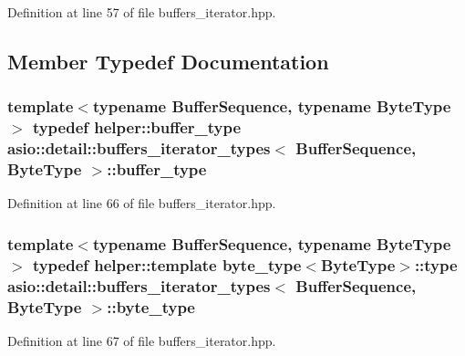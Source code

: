 Definition at line 57 of file buffers\+\_\+iterator.\+hpp.



\subsection{Member Typedef Documentation}
\hypertarget{structasio_1_1detail_1_1buffers__iterator__types_a7aa8572359d0a382a741a69ca1d46e22}{}
\subsubsection[{buffer\+\_\+type}]{\setlength{\rightskip}{0pt plus 5cm}template$<$typename Buffer\+Sequence, typename Byte\+Type$>$ typedef helper\+::buffer\+\_\+type {\bf asio\+::detail\+::buffers\+\_\+iterator\+\_\+types}$<$ Buffer\+Sequence, Byte\+Type $>$\+::{\bf buffer\+\_\+type}}\label{structasio_1_1detail_1_1buffers__iterator__types_a7aa8572359d0a382a741a69ca1d46e22}


Definition at line 66 of file buffers\+\_\+iterator.\+hpp.

\hypertarget{structasio_1_1detail_1_1buffers__iterator__types_a1e923f24ebb373133ae1c54a816fce3e}{}
\subsubsection[{byte\+\_\+type}]{\setlength{\rightskip}{0pt plus 5cm}template$<$typename Buffer\+Sequence, typename Byte\+Type$>$ typedef helper\+::template {\bf byte\+\_\+type}$<$Byte\+Type$>$\+::type {\bf asio\+::detail\+::buffers\+\_\+iterator\+\_\+types}$<$ Buffer\+Sequence, Byte\+Type $>$\+::{\bf byte\+\_\+type}}\label{structasio_1_1detail_1_1buffers__iterator__types_a1e923f24ebb373133ae1c54a816fce3e}


Definition at line 67 of file buffers\+\_\+iterator.\+hpp.

\hypertarget{structasio_1_1detail_1_1buffers__iterator__types_ae6a5428132b9db89770ce9bea21a970b}{}
